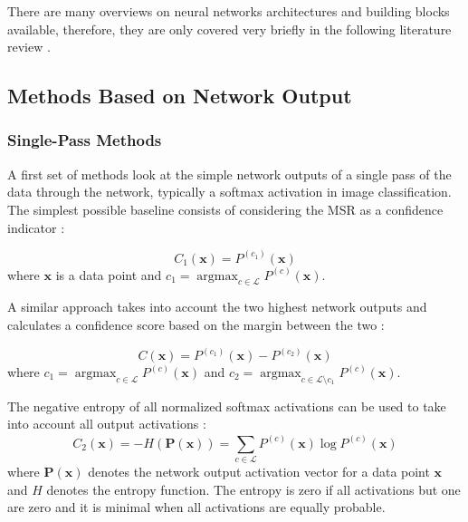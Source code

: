 \documentclass[10pt]{article}
\DeclareMathOperator{\argmax}{argmax}
\begin{document}
There are many overviews on neural networks architectures and building blocks available, therefore, they are only covered very briefly in the following literature review \cite{Schmidhuber2015DeepLI, Zhu2017DeepLI, Kampffmeyer2016SemanticSO}.

\subsection{Methods Based on Network Output}
\subsubsection{Single-Pass Methods}
A first set of methods look at the simple network outputs of a single pass of the data through the network, typically a softmax activation in image classification. The simplest possible baseline consists of considering the \acrfull{MSR} as a confidence indicator \cite{HendrycksG16c, zaragoza}:

\begin{equation}
	\label{eq:net_msr}
    C_1(\mathbf{x})=P^{(c_1)}(\mathbf{x})
\end{equation}
where $\mathbf{x}$ is a data point and $c_1=\argmax_{c\in\mathcal{L}}P^{(c)}(\mathbf{x})$.

A similar approach takes into account the two highest network outputs and calculates a confidence score based on the margin between the two \cite{ouerghemmi_two-step_2017, mandelbaum17}:

\begin{equation}
	\label{eq:net_margin}
    C(\mathbf{x})=P^{(c_1)}(\mathbf{x})-P^{(c_2)}(\mathbf{x})
\end{equation}
where $c_1=\argmax_{c\in\mathcal{L}}P^{(c)}(\mathbf{x})$ and $c_2=\argmax_{c\in\mathcal{L}\setminus c_1}P^{(c)}(\mathbf{x})$.

The negative entropy of all normalized softmax activations can be used to take into account all output activations \cite{zaragoza}:
\begin{equation}
    \label{eq:net_entropy}
    C_2(\mathbf{x}) = -H(\mathbf{P(\mathbf{x})}) = \sum_{c\in \mathcal{L}}^{}P^{(c)}(\mathbf{x})\log P^{(c)}(\mathbf{x})
\end{equation}
where $\mathbf{\mathbf{P(x)}}$ denotes the network output activation vector for a data point $\mathbf{x}$ and $H$ denotes the entropy function. The entropy is zero if all activations but one are zero and it is minimal when all activations are equally probable.
\end{document}
